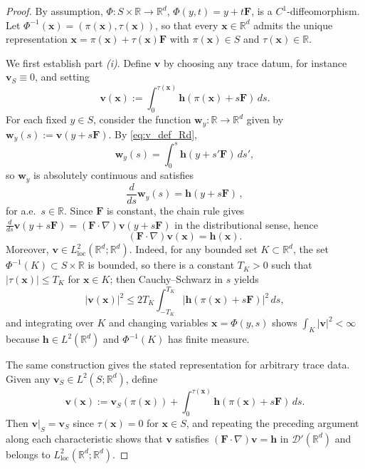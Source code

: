 \documentclass[10pt,a4paper]{amsart}
\begin{document}
\begin{proof}
By assumption, $\Phi:S\times\mathbb R\to\mathbb R^d$, $\Phi(y,t)=y+t\mathbf F$, is a $C^1$-diffeomorphism.
Let $\Phi^{-1}(\boldsymbol x)=(\pi(\boldsymbol x),\tau(\boldsymbol x))$, so that every $\boldsymbol x\in\mathbb R^d$ admits the unique representation
$\boldsymbol x=\pi(\boldsymbol x)+\tau(\boldsymbol x)\mathbf F$ with $\pi(\boldsymbol x)\in S$ and $\tau(\boldsymbol x)\in\mathbb R$.

We first establish part \textit{(i)}. Define $\boldsymbol v$ by choosing any trace datum, for instance
$\boldsymbol v_S\equiv 0$, and setting
\begin{equation}\label{eq:v_def_Rd}
\boldsymbol v(\boldsymbol x):={{} \int_0^{\tau(\boldsymbol x)} \boldsymbol h(\pi(\boldsymbol x)+s\mathbf F)\,ds.}
\end{equation}
For each fixed $y\in S$, consider the function $\boldsymbol w_y:\mathbb R\to\mathbb R^d$ given by
$\boldsymbol w_y(s):=\boldsymbol v(y+s\mathbf F)$. By \eqref{eq:v_def_Rd},
\[
\boldsymbol w_y(s)={{} \int_0^s \boldsymbol h(y+s'\mathbf F)\,ds',}
\]
so $\boldsymbol w_y$ is absolutely continuous and satisfies
\[
\frac{d}{ds}\boldsymbol w_y(s)={{} \boldsymbol h(y+s\mathbf F)\,,}
\]
for a.e.~$s\in\mathbb{R}$. Since $\mathbf F$ is constant, the chain rule gives $\frac{d}{ds}\boldsymbol v(y+s\mathbf F)=(\mathbf F\cdot\nabla)\boldsymbol v(y+s\mathbf F)$
in the distributional sense, hence
\[
(\mathbf F\cdot\nabla)\boldsymbol v(\boldsymbol x)={{} \boldsymbol h(\boldsymbol x).}
\]
Moreover, $\boldsymbol v\in L^2_{\mathrm{loc}}(\mathbb R^d;\mathbb R^d)$. Indeed, for any bounded set $K\subset\mathbb R^d$,
the set $\Phi^{-1}(K)\subset S\times\mathbb R$ is bounded, so there is a constant $T_K>0$ such that $|\tau(\boldsymbol x)|\le T_K$ for $\boldsymbol x\in K$; then
Cauchy--Schwarz in $s$ yields
\[
|\boldsymbol v(\boldsymbol x)|^2
\le 2T_K \int_{-T_K}^{T_K} |\boldsymbol h(\pi(\boldsymbol x)+s\mathbf F)|^2\,ds,
\]
and integrating over $K$ and changing variables $\boldsymbol x=\Phi(y,s)$ shows $\int_K |\boldsymbol v|^2<\infty$
because $\boldsymbol h\in L^2(\mathbb R^d)$ and $\Phi^{-1}(K)$ has finite measure.

The same construction gives the stated representation for arbitrary trace data.
Given any $\boldsymbol v_S\in L^2(S;\mathbb R^d)$, define
\begin{equation}\label{eq:v_def_Rd_vs}
\boldsymbol v(\boldsymbol x):=\boldsymbol v_S(\pi(\boldsymbol x)) +\int_0^{\tau(\boldsymbol x)} \boldsymbol h(\pi(\boldsymbol x)+s\mathbf F)\,ds.
\end{equation}
Then $\boldsymbol v|_S=\boldsymbol v_S$ since $\tau(\boldsymbol x)=0$ for $\boldsymbol x\in S$, and repeating the preceding argument along each
characteristic shows that $\boldsymbol v$ satisfies $(\mathbf F\cdot\nabla)\boldsymbol v={{} \boldsymbol h}$
in $\mathcal D'(\mathbb R^d)$ and belongs to $L^2_{\mathrm{loc}}(\mathbb{R}^d; \mathbb{R}^d)$.


\end{proof}
\end{document}
